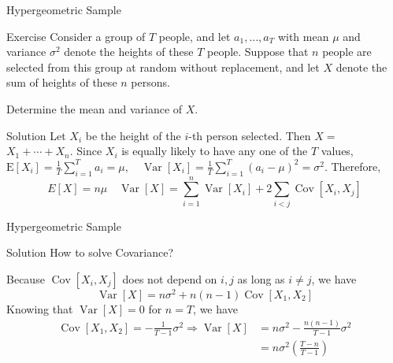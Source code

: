 \documentclass{beamer}
\begin{document}
\begin{frame}{Hypergeometric Sample}
\begin{block}{Exercise}
Consider a group of $T$ people, and let $a_{1}, \ldots, a_{T}$ with mean $\mu$ and variance $\sigma^2$ denote the heights of these $T$ people. Suppose that $n$ people are selected from this group at random without replacement, and let $X$ denote the sum of heights of these $n$ persons. 

Determine the mean and variance of $X$.
\end{block}
\begin{block}{Solution}
Let $X_{i}$ be the height of the $i$-th person selected. Then $X=$ $X_{1}+\cdots+X_{n}$. Since $X_{i}$ is equally likely to have any one of the $T$ values, $\mathrm{E}\left[X_{i}\right]=\frac{1}{T} \sum_{i=1}^{T} a_{i}=\mu, \quad \operatorname{Var}\left[X_{i}\right]=\frac{1}{T} \sum_{i=1}^{T}\left(a_{i}-\mu\right)^{2}=\sigma^{2} .$
Therefore, $$E[X]=n \mu
\quad
\operatorname{Var}[X]=\sum_{i=1}^{n} \operatorname{Var}\left[X_{i}\right]+2 \sum_{i<j} \operatorname{Cov}\left[X_{i}, X_{j}\right]
$$
\end{block}
\end{frame}

\begin{frame}{Hypergeometric Sample}
\begin{block}{Solution}
How to solve Covariance?

Because $\operatorname{Cov}\left[X_{i}, X_{j}\right]$ does not depend on $i, j$ as long as $i \neq j$, we have
$$
\operatorname{Var}[X]=n \sigma^{2}+n(n-1) \operatorname{Cov}\left[X_{1}, X_{2}\right]
$$
Knowing that $\operatorname{Var}[X]=0$ for $n=T$, we have
$$
\begin{aligned}
\operatorname{Cov}\left[X_{1}, X_{2}\right]=-\frac{1}{T-1} \sigma^{2} \Rightarrow \operatorname{Var}[X] &=n \sigma^{2}-\frac{n(n-1)}{T-1} \sigma^{2} \\
&=n \sigma^{2}\left(\frac{T-n}{T-1}\right)
\end{aligned}
$$
\end{block}
\end{frame}
\end{document}
